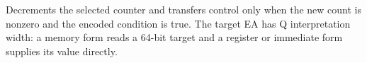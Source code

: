 Decrements the selected counter and transfers control only when the new count is nonzero and the encoded condition is true. The target EA has Q interpretation width: a memory form reads a 64-bit target and a register or immediate form supplies its value directly.
